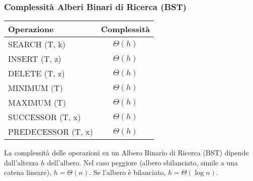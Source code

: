 \subsubsection{Complessità Alberi Binari di Ricerca (BST)}

\begin{tabular}{|l|c|}
\hline
\textbf{Operazione} & \textbf{Complessità} \\
\hline
SEARCH (T, k) & $\Theta(h)$ \\
\hline
INSERT (T, z) & $\Theta(h)$ \\
\hline
DELETE (T, z) & $\Theta(h)$ \\
\hline
MINIMUM (T) & $\Theta(h)$ \\
\hline
MAXIMUM (T) & $\Theta(h)$ \\
\hline
SUCCESSOR (T, x) & $\Theta(h)$ \\
\hline
PREDECESSOR (T, x) & $\Theta(h)$ \\
\hline
\end{tabular}

\vspace{2mm}
\footnotesize{La complessità delle operazioni su un Albero Binario di Ricerca (BST) dipende dall'altezza $h$ dell'albero. Nel caso peggiore (albero sbilanciato, simile a una catena lineare), $h = \Theta(n)$. Se l'albero è bilanciato, $h = \Theta(\log n)$.}
